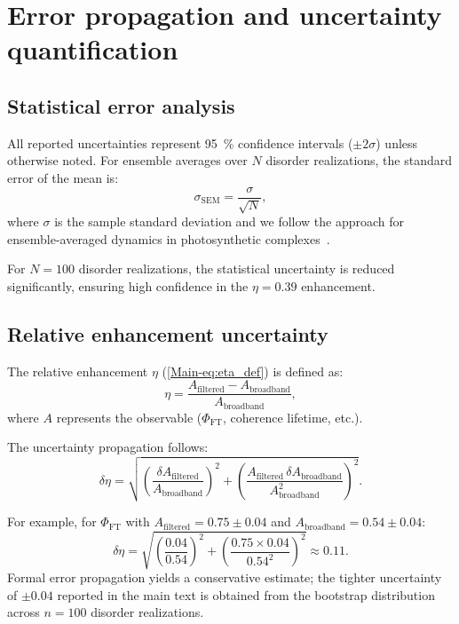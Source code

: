 \documentclass[11pt,a4paper]{article}
\begin{document}
\section{Error propagation and uncertainty quantification}
\label{sec:S10}

\subsection{Statistical error analysis}

All reported uncertainties represent \SI{95}{\percent} confidence intervals ($\pm 2\sigma$) unless otherwise noted. For ensemble averages over $N$ disorder realizations, the standard error of the mean is:
\begin{equation}
\sigma_{\mathrm{SEM}} = \frac{\sigma}{\sqrt{N}},
\label{eq:SEM}
\end{equation}
where $\sigma$ is the sample standard deviation and we follow the approach for ensemble-averaged dynamics in photosynthetic complexes~\cite{Moix2011}.

For $N = 100$ disorder realizations, the statistical uncertainty is reduced significantly, ensuring high confidence in the $\eta = 0.39$ enhancement.

\subsection{Relative enhancement uncertainty}

The relative enhancement $\eta$ (\cref{Main-eq:eta_def}) is defined as:
\begin{equation}
\eta = \frac{A_{\mathrm{filtered}} - A_{\mathrm{broadband}}}{A_{\mathrm{broadband}}},
\label{eq:SI_eta_def}
\end{equation}
where $A$ represents the observable ($\Phi_{\mathrm{FT}}$, coherence lifetime, etc.).

The uncertainty propagation follows:
\begin{equation}
\delta\eta = \sqrt{\left(\frac{\delta A_{\mathrm{filtered}}}{A_{\mathrm{broadband}}}\right)^2 + \left(\frac{A_{\mathrm{filtered}} \, \delta A_{\mathrm{broadband}}}{A_{\mathrm{broadband}}^2}\right)^2}.
\label{eq:error_propagation}
\end{equation}

For example, for $\Phi_{\mathrm{FT}}$ with $A_{\mathrm{filtered}} = 0.75 \pm 0.04$ and $A_{\mathrm{broadband}} = 0.54 \pm 0.04$:
\begin{equation}
\delta\eta = \sqrt{\left(\frac{0.04}{0.54}\right)^2 + \left(\frac{0.75 \times 0.04}{0.54^2}\right)^2} \approx 0.11.
\end{equation}
Formal error propagation yields a conservative estimate; the tighter uncertainty of $\pm 0.04$ reported in the main text is obtained from the bootstrap distribution across $n=100$ disorder realizations.
\end{document}
